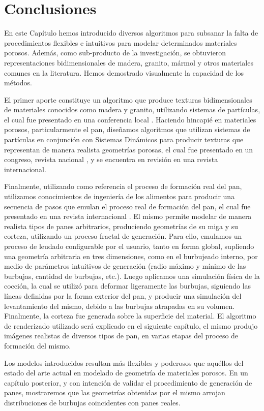 \section{Conclusiones}
En este Cap\'itulo hemos introducido diversos algoritmos para subsanar la falta de procedimientos flexibles e intuitivos para modelar determinados materiales porosos.
Además, como sub-producto de la investigación, se obtuvieron representaciones bidimensionales de madera, granito, mármol y otros materiales comunes en la literatura.
Hemos demostrado visualmente la capacidad de los métodos.

El primer aporte constituye un algoritmo que produce texturas bidimensionales de materiales conocidos como madera y granito, utilizando sistemas de partículas, el cual fue presentado en una conferencia local \cite{Baravalle2011}.
Haciendo hincapié en materiales porosos, particularmente el pan, diseñamos algoritmos que utilizan sistemas de partículas en conjunción con Sistemas Dinámicos para producir texturas que representan de manera realista geometrías porosas, el cual fue presentado en un congreso, revista nacional \cite{Baravalle2014}, y se encuentra en revisión en una revista internacional.

Finalmente, utilizando como referencia el proceso de formación real del pan, utilizamos conocimientos de ingeniería de los alimentos para producir una secuencia de pasos que emulan el proceso real de formación del pan, el cual fue presentado en una revista internacional \cite{Baravalle2015_2}.
El mismo permite modelar de manera realista tipos de panes arbitrarios, produciendo geometrías de su miga y su corteza, utilizando un proceso fractal de generación.
Para ello, emulamos un proceso de leudado configurable por el usuario, tanto en forma global, supliendo una geometría arbitraria en tres dimensiones, como en el burbujeado interno, por medio de parámetros intuitivos de generación (radio máximo y mínimo de las burbujas, cantidad de burbujas, etc.).
Luego aplicamos una simulación física de la cocción, la cual se utilizó para deformar ligeramente las burbujas, siguiendo las líneas definidas por la forma exterior del pan, y producir una simulación del levantamiento del mismo, debido a las burbujas atrapadas en su volumen.
Finalmente, la corteza fue generada sobre la superficie del material.
El algoritmo de renderizado utilizado será explicado en el siguiente capítulo, el mismo produjo imágenes realistas de diversos tipos de pan, en varias etapas del proceso de formación del mismo.

Los modelos introducidos resultan más flexibles y poderosos que aquéllos del estado del arte actual en modelado de geometría de materiales porosos.
En un capítulo posterior, y con intención de validar el procedimiento de generación de panes, mostraremos que las geometrías obtenidas por el mismo arrojan distribuciones de burbujas coincidentes con panes reales.

